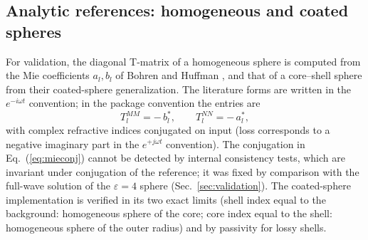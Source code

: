 \documentclass[11pt]{article}
\begin{document}
\subsection{Analytic references: homogeneous and coated spheres}
For validation, the diagonal T-matrix of a homogeneous sphere is computed
from the Mie coefficients $a_l, b_l$ of Bohren and Huffman
\cite{BohrenHuffman}, and that of a core--shell sphere from their
coated-sphere generalization.  The literature forms are written in the
$e^{-i\omega t}$ convention; in the package convention the entries are
\begin{equation}
T^{MM}_l = -\,b_l^{*}, \qquad T^{NN}_l = -\,a_l^{*},
\label{eq:mieconj}
\end{equation}
with complex refractive indices conjugated on input (loss corresponds to
a negative imaginary part in the $e^{+j\omega t}$ convention).  The
conjugation in Eq.~(\ref{eq:mieconj}) cannot be detected by internal
consistency tests, which are invariant under conjugation of the
reference; it was fixed by comparison with the full-wave solution of
the $\varepsilon=4$ sphere (Sec.~\ref{sec:validation}).  The
coated-sphere implementation is verified in its two exact limits (shell
index equal to the background: homogeneous sphere of the core; core
index equal to the shell: homogeneous sphere of the outer radius) and by
passivity for lossy shells.
\end{document}
